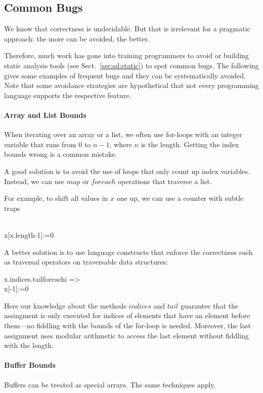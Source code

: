\subsection{Common Bugs}\label{sec:sd:commonbugs}

We know that correctness is undecidable.
But that is irrelevant for a pragmatic approach: the more can be avoided, the better.

Therefore, much work has gone into training programmers to avoid or building static analysis tools (see Sect.~\ref{sec:sd:static}) to spot common bugs.
The following gives some examples of frequent bugs and they can be systematically avoided.
Note that some avoidance strategies are hypothetical that not every programming language supports the respective feature.

\paragraph{Array and List Bounds}
When iterating over an array or a list, we often use for-loops with an integer variable that runs from $0$ to $n-1$, where $n$ is the length.
Getting the index bounds wrong is a common mistake.

A good solution is to avoid the use of loops that only count up index variables.
Instead, we can use $map$ or $foreach$ operations that traverse a list.

For example, to shift all values in $x$ one up, we can use a counter with subtle traps 
\begin{acode}
\\
x[x.length-1]:=0
\end{acode}

A better solution is to use language constructs that enforce the correctness such as traversal operators on traversable data structures:
\begin{acode}
x.indices.tail\;foreach\;i =>\\
x[-1]:=0
\end{acode}
Here our knowledge about the methods $indices$ and $tail$ guarantee that the assingment is only executed for indices of elements that have an element before them---no fiddling with the bounds of the for-loop is needed.
Moreover, the last assignment uses modular arithmetic to access the last element without fiddling with the length.

\paragraph{Buffer Bounds}
Buffers can be treated as special arrays.
The same techniques apply.

